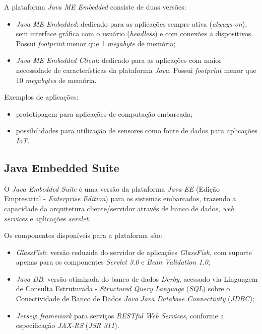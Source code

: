 A plataforma \textit{Java ME Embedded} consiste de duas versões:

\begin{itemize}
    
    \item \textit{Java ME Embedded}: dedicado para as aplicações sempre ativa 
    (\textit{always-on}), sem interface gráfica com o usuário 
    (\textit{headless}) e com conexões a dispositivos. Possui 
    \textit{footprint} menor que 1 \textit{megabyte} de memória;
    
    \item \textit{Java ME Embedded Client}: dedicado para as aplicações com 
    maior necessidade de características da plataforma \textit{Java}. Possui 
    \textit{footprint} menor que 10 \textit{megabytes} de memória.
    
\end{itemize}

Exemplos de aplicações:

\begin{itemize}
    
    \item prototipagem para aplicações de computação embarcada;
    
    \item possibilidades para utilização de sensores como fonte de dados para 
    aplicações \textit{IoT}.
    
\end{itemize}

\subsection{Java Embedded Suite}

O \textit{Java Embedded Suite} é uma versão da plataforma \textit{Java EE}
(Edição Empresarial - \textit{Enterprise Edition}) para os sistemas embarcados,
trazendo a capacidade da arquitetura cliente/servidor através de banco de
dados, \textit{web services} e aplicações \textit{servlet}.

Os componentes disponíveis para a plataforma são:

\begin{itemize}
    
    \item \textit{GlassFish}: versão reduzida do servidor de aplicações
    \textit{GlassFish}, com suporte apenas para os componentes \textit{Servlet
    3.0} e \textit{Bean Validation 1.0};
    
    \item \textit{Java DB}: versão otimizada do banco de dados \textit{Derby},
    acessado via Linguagem de Consulta Estruturada - \textit{Structured Query
    Language} (\textit{SQL}) sobre o Conectividade de Banco de Dados
    \textit{Java} \textit{Java Database Connectivity} (\textit{JDBC});
    
    \item \textit{Jersey}: \textit{framework} para serviços \textit{RESTful Web 
    Services}, conforme a especificação \textit{JAX-RS} (\textit{JSR 311}).

\end{itemize}

